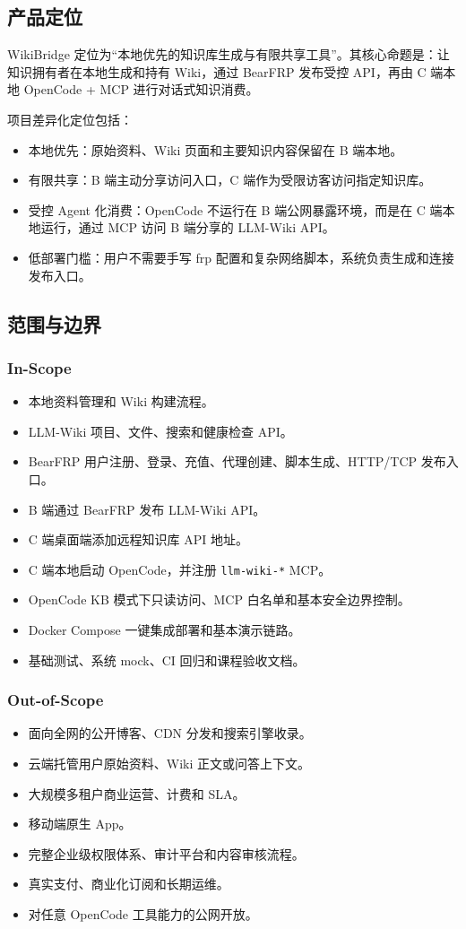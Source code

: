 \documentclass[UTF8,a4paper,12pt,fontset=fandol]{ctexart}
\newcommand{\code}[1]{\begingroup\urlstyle{tt}\footnotesize\nolinkurl{#1}\endgroup}
\begin{document}
\subsection{产品定位}
WikiBridge 定位为“本地优先的知识库生成与有限共享工具”。其核心命题是：让知识拥有者在本地生成和持有 Wiki，通过 BearFRP 发布受控 API，再由 C 端本地 OpenCode + MCP 进行对话式知识消费。

项目差异化定位包括：
\begin{itemize}
  \item 本地优先：原始资料、Wiki 页面和主要知识内容保留在 B 端本地。
  \item 有限共享：B 端主动分享访问入口，C 端作为受限访客访问指定知识库。
  \item 受控 Agent 化消费：OpenCode 不运行在 B 端公网暴露环境，而是在 C 端本地运行，通过 MCP 访问 B 端分享的 LLM-Wiki API。
  \item 低部署门槛：用户不需要手写 frp 配置和复杂网络脚本，系统负责生成和连接发布入口。
\end{itemize}

\subsection{范围与边界}
\subsubsection{In-Scope}
\begin{itemize}
  \item 本地资料管理和 Wiki 构建流程。
  \item LLM-Wiki 项目、文件、搜索和健康检查 API。
  \item BearFRP 用户注册、登录、充值、代理创建、脚本生成、HTTP/TCP 发布入口。
  \item B 端通过 BearFRP 发布 LLM-Wiki API。
  \item C 端桌面端添加远程知识库 API 地址。
  \item C 端本地启动 OpenCode，并注册 \code{llm-wiki-*} MCP。
  \item OpenCode KB 模式下只读访问、MCP 白名单和基本安全边界控制。
  \item Docker Compose 一键集成部署和基本演示链路。
  \item 基础测试、系统 mock、CI 回归和课程验收文档。
\end{itemize}

\subsubsection{Out-of-Scope}
\begin{itemize}
  \item 面向全网的公开博客、CDN 分发和搜索引擎收录。
  \item 云端托管用户原始资料、Wiki 正文或问答上下文。
  \item 大规模多租户商业运营、计费和 SLA。
  \item 移动端原生 App。
  \item 完整企业级权限体系、审计平台和内容审核流程。
  \item 真实支付、商业化订阅和长期运维。
  \item 对任意 OpenCode 工具能力的公网开放。
\end{itemize}
\end{document}

